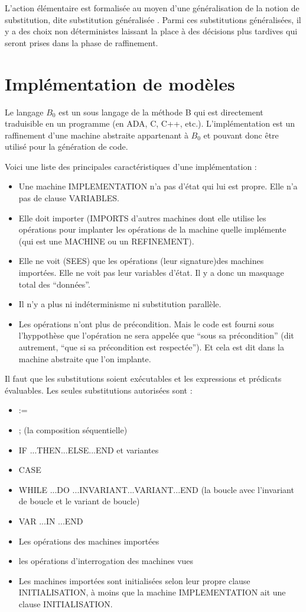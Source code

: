 \documentclass[10pt,a4paper]{article}
\begin{document}
L’action élémentaire est formalisée au moyen d’une généralisation de la notion de substitution, dite \og substitution généralisée \fg. Parmi ces substitutions généralisées,
il y a des choix non déterministes laissant la place à des décisions plus tardives qui seront prises dans la phase de raffinement.

\section{Implémentation de modèles}

Le langage $B_0$ est un sous langage de la méthode B qui est directement traduisible en un programme (en ADA, C, C++, etc.).
L'implémentation est un raffinement d'une machine abstraite appartenant à $B_0$ et pouvant donc être utilisé pour la génération de code.

Voici une liste des principales caractéristiques d'une implémentation :
\begin{itemize}
\item Une machine IMPLEMENTATION n’a pas d’état qui lui est propre. Elle n’a pas de clause VARIABLES.
\item Elle doit importer (IMPORTS d’autres machines dont elle utilise les opérations pour implanter les opérations de la machine quelle implémente (qui est une MACHINE ou un REFINEMENT). 
\item Elle ne voit (SEES) que les opérations (leur signature)des machines importées. Elle ne voit pas leur variables d’état. Il y a donc un masquage total des “données”. 
\item Il n’y a plus ni indéterminisme ni substitution parallèle.
\item Les opérations n’ont plus de précondition. Mais le code est fourni sous l’hyppothèse que l’opération ne sera appelée que “sous sa précondition” (dit autrement, “que si sa précondition est respectée”). Et cela est dit dans la machine abstraite que l’on implante.
\end{itemize}

Il faut que les substitutions soient exécutables et les expressions et prédicats évaluables.
Les seules substitutions autorisées sont :
\begin{itemize}
\item :=
\item ; (la composition séquentielle)
\item IF ...THEN...ELSE...END et variantes
\item CASE
\item WHILE ...DO ...INVARIANT...VARIANT...END (la boucle avec l’invariant de boucle et le variant de boucle)
\item VAR ...IN ...END
\item Les opérations des machines importées
\item les opérations d’interrogation des machines vues
\item Les machines importées sont initialisées selon leur propre clause INITIALISATION, à moins que la machine IMPLEMENTATION ait une clause INITIALISATION.
\end{itemize}
\end{document}
